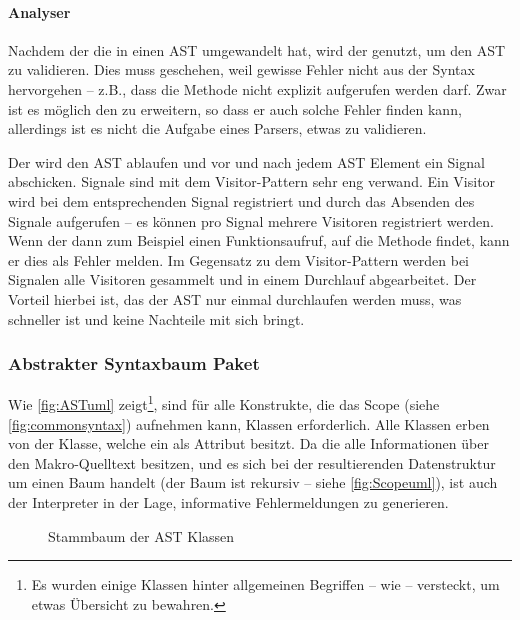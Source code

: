       \paragraph{Analyser}
        Nachdem der  die  in einen AST umgewandelt hat, wird der  genutzt, um den AST zu validieren. Dies muss geschehen, weil gewisse Fehler nicht aus der Syntax hervorgehen -- z.B., dass die  Methode nicht explizit aufgerufen werden darf. Zwar ist es möglich den  zu erweitern, so dass er auch solche Fehler finden kann, allerdings ist es nicht die Aufgabe eines Parsers, etwas zu validieren.

        Der  wird den AST ablaufen und vor und nach jedem AST Element ein Signal abschicken. Signale sind mit dem Visitor-Pattern \autocite[S.366]{Gamma:1995:DPE:186897} sehr eng verwand. Ein Visitor wird bei dem entsprechenden Signal registriert und durch das Absenden des Signale aufgerufen -- es können pro Signal mehrere Visitoren registriert werden. Wenn der  dann zum Beispiel einen Funktionsaufruf, auf die  Methode findet, kann er dies als Fehler melden. Im Gegensatz zu dem Visitor-Pattern werden bei Signalen alle Visitoren gesammelt und in einem Durchlauf abgearbeitet. Der Vorteil hierbei ist, das der AST nur einmal durchlaufen werden muss, was schneller ist und keine Nachteile mit sich bringt.

    \subsubsection{Abstrakter Syntaxbaum Paket}
    \label{sssec:Abstrakter Syntaxbaum Paket}
      Wie \autoref{fig:ASTuml} zeigt\footnote{
        Es wurden einige Klassen hinter allgemeinen Begriffen -- wie  -- versteckt, um etwas Übersicht zu bewahren.
      }, sind für alle Konstrukte, die das Scope (siehe \autoref{fig:commonsyntax}) aufnehmen kann, Klassen erforderlich. Alle Klassen erben von der  Klasse, welche ein  als Attribut besitzt. Da die  alle Informationen über den Makro-Quelltext besitzen, und es sich bei der resultierenden Datenstruktur um einen Baum handelt (der Baum ist rekursiv -- siehe \autoref{fig:Scopeuml}), ist auch der Interpreter in der Lage, informative Fehlermeldungen zu generieren.
      \begin{figure}[H]
        \centering
        \caption{Stammbaum der AST Klassen}
        \label{fig:ASTuml}
      \end{figure}

